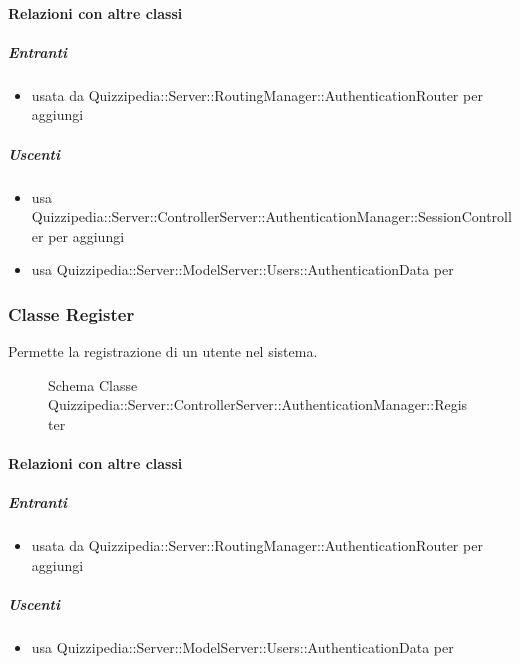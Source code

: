 \paragraph{Relazioni con altre classi}
\subparagraph{Entranti}
\begin{itemize}
\item usata da Quizzipedia::Server::RoutingManager::AuthenticationRouter per aggiungi
\end{itemize}
\subparagraph{Uscenti}
\begin{itemize}
\item usa Quizzipedia::Server::ControllerServer::AuthenticationManager::SessionController per aggiungi
\item usa Quizzipedia::Server::ModelServer::Users::AuthenticationData per 
\end{itemize}
\subsubsection{Classe Register}
Permette la registrazione di un utente nel sistema.
\begin{figure}[H]
\centering
\noindent{}
\caption[Schema Classe Register]{Schema Classe Quizzipedia::Server::ControllerServer::AuthenticationManager::Register}
\end{figure}
\paragraph{Relazioni con altre classi}
\subparagraph{Entranti}
\begin{itemize}
\item usata da Quizzipedia::Server::RoutingManager::AuthenticationRouter per aggiungi
\end{itemize}
\subparagraph{Uscenti}
\begin{itemize}
\item usa Quizzipedia::Server::ModelServer::Users::AuthenticationData per 
\end{itemize}
